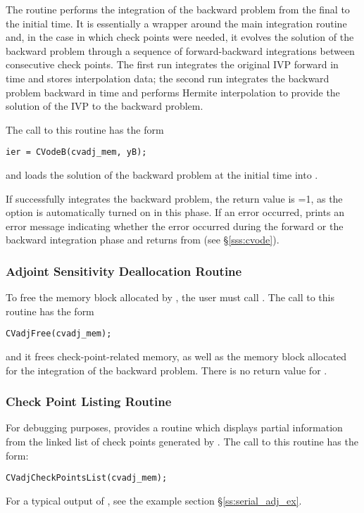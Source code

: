 The routine  performs the integration of the backward problem
from the final to the initial time. It is essentially a wrapper
around the {\cvodes} main integration routine  and, in the case
in which check points were needed, it evolves the solution of the backward 
problem through a sequence of forward-backward integrations between consecutive
check points. The first run integrates the original IVP forward in time and
stores interpolation data; the second run integrates the backward problem 
backward in time and performs Hermite interpolation to provide
the solution of the IVP to the backward problem.

The call to this routine has the form
\begin{verbatim}
ier = CVodeB(cvadj_mem, yB);
\end{verbatim}
and loads the solution of the backward problem at the initial time into
. 

If  successfully integrates the backward problem, the return value
is =1, as the  option is automatically turned on in this
phase. If an error occurred,  prints an error message indicating whether 
the error occurred during the forward or the backward integration phase and returns 
 from  (see \S\ref{sss:cvode}).

\subsubsection{Adjoint Sensitivity Deallocation Routine}\label{sss:cvadjfree}

To free the  memory block allocated by , the
user must call . The call to this routine has the form
\begin{verbatim}
CVadjFree(cvadj_mem);
\end{verbatim}
and it frees check-point-related memory, as well as the {\cvodes} memory block
allocated for the integration of the backward problem. There is no return 
value for .

\subsubsection{Check Point Listing Routine}

For debugging purposes, {\cvodes} provides a routine  which
displays partial information from the linked list of check points generated by
. The call to this routine has the form:
\begin{verbatim}
CVadjCheckPointsList(cvadj_mem);
\end{verbatim}
For a typical output of , see the example section
\S\ref{ss:serial_adj_ex}.

